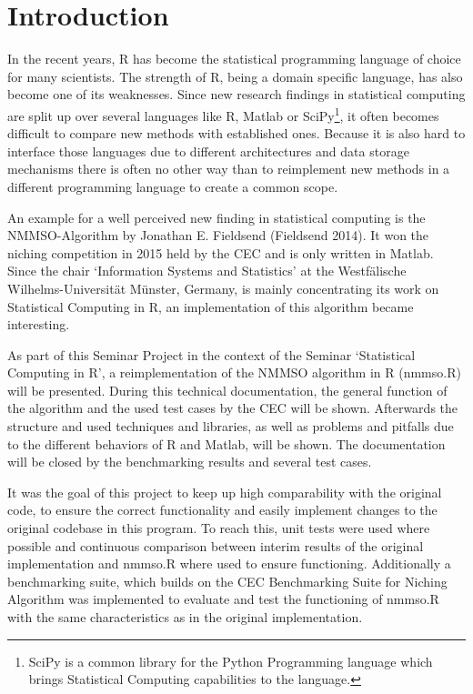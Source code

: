 \documentclass[12pt,a4paper]{article}
\begin{document}
\renewcommand\refname{References} %


\newpage
{} %
\tableofcontents
\newpage


\section{Introduction}\label{introduction}

In the recent years, R has become the statistical programming language
of choice for many scientists. The strength of R, being a domain
specific language, has also become one of its weaknesses. Since new
research findings in statistical computing are split up over several
languages like R, Matlab or SciPy\footnote{SciPy is a common library for
  the Python Programming language which brings Statistical Computing
  capabilities to the language. \newpage}, it often becomes difficult to
compare new methods with established ones. Because it is also hard to
interface those languages due to different architectures and data
storage mechanisms there is often no other way than to reimplement new
methods in a different programming language to create a common scope.

An example for a well perceived new finding in statistical computing is
the NMMSO-Algorithm by Jonathan E. Fieldsend (Fieldsend 2014). It won
the niching competition in 2015 held by the CEC and is only written in
Matlab. Since the chair `Information Systems and Statistics' at the
Westfälische Wilhelms-Universität Münster, Germany, is mainly
concentrating its work on Statistical Computing in R, an implementation
of this algorithm became interesting.

As part of this Seminar Project in the context of the Seminar
`Statistical Computing in R', a reimplementation of the NMMSO algorithm
in R (nmmso.R) will be presented. During this technical documentation,
the general function of the algorithm and the used test cases by the CEC
will be shown. Afterwards the structure and used techniques and
libraries, as well as problems and pitfalls due to the different
behaviors of R and Matlab, will be shown. The documentation will be
closed by the benchmarking results and several test cases.

It was the goal of this project to keep up high comparability with the
original code, to ensure the correct functionality and easily implement
changes to the original codebase in this program. To reach this, unit
tests were used where possible and continuous comparison between interim
results of the original implementation and nmmso.R where used to ensure
functioning. Additionally a benchmarking suite, which builds on the CEC
Benchmarking Suite for Niching Algorithm was implemented to evaluate and
test the functioning of nmmso.R with the same characteristics as in the
original implementation.
\end{document}
